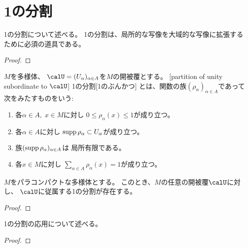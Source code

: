 \documentclass[report]{jlreq}
\begin{document}
\section{1の分割}

1の分割について述べる。
1の分割は、局所的な写像を大域的な写像に拡張するために必須の道具である。

\begin{proof}
    \TODO{}
\end{proof}

\begin{definition}[1の分割]
    $M$を多様体、
    $\calU = (U_\alpha)_{\alpha \in A}$を$M$の開被覆とする。
    [partition of unity subordinate to $\calU$]
        {1の分割}[1のぶんかつ]
    とは、{\smooth}関数の族$(\rho_\alpha)_{\alpha \in A}$であって
    次をみたすものをいう:
    \begin{enumerate}
        \item 各$\alpha \in A, \; x \in M$に対し
            $0 \le \rho_\alpha(x) \le 1$が成り立つ。
        \item 各$\alpha \in A$に対し
            $\operatorname{supp} \rho_\alpha \subset U_\alpha$が成り立つ。
        \item 族$(\operatorname{supp} \rho_\alpha)_{\alpha \in A}$は
            局所有限である。
        \item 各$x \in M$に対し
            $\sum_{\alpha \in A} \rho_\alpha(x) = 1$が成り立つ。
    \end{enumerate}
\end{definition}

\begin{theorem}[1の分割の存在]
    $M$をパラコンパクトな多様体とする。
    このとき、$M$の任意の開被覆$\calU$に対し、
    $\calU$に従属する1の分割が存在する。
\end{theorem}

\begin{proof}
    \TODO{}
\end{proof}

1の分割の応用について述べる。

\begin{proposition}
    \TODO{}
\end{proposition}

\begin{proof}
    \TODO{}
\end{proof}


%
\newpage
\end{document}

